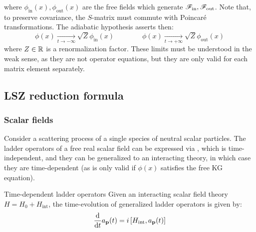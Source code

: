 where $ \phi_\text{in}(x) , \phi_\text{out}(x) $ are the free fields which generate $ \mathscr{F}_\text{in} , \mathscr{F}_\text{out} $. Note that, to preserve covariance, the $ S $-matrix must commute with Poincaré transformations.
The adiabatic hypothesis asserts then:
\begin{equation}
  \phi(x) \xrightarrow[t \rightarrow -\infty]{} \sqrt{Z} \phi_\text{in}(x)
  \qquad \qquad
  \phi(x) \xrightarrow[t \rightarrow +\infty]{} \sqrt{Z} \phi_\text{out}(x)
  \label{eq:adiabatic-hyp}
\end{equation}
where $ Z \in \mathbb{R} $ is a renormalization factor. These limits must be understood in the weak sense, as they are not operator equations, but they are only valid for each matrix element separately\footnotemark.
%

\subsection{LSZ reduction formula}

\subsubsection{Scalar fields}

Consider a scattering process of a single species of neutral scalar particles. The ladder operators of a free real scalar field can be expressed via , which is time-independent, and they can be generalized to an interacting theory, in which case they are time-dependent (as  is only valid if $ \phi(x) $ satisfies the free KG equation).

\begin{proposition}{Time-dependent ladder operators}{}
  Given an interacting scalar field theory $ H = H_0 + H_\text{int} $, the time-evolution of generalized ladder operators is given by:
  \begin{equation}
    \frac{\mathrm{d}}{\mathrm{d} t} a_{\mathbf{p}}(t) = i \left[ H_\text{int} , a_{\mathbf{p}}(t) \right]
    \label{eq:in-out-lad-temp}
  \end{equation}
\end{proposition}


